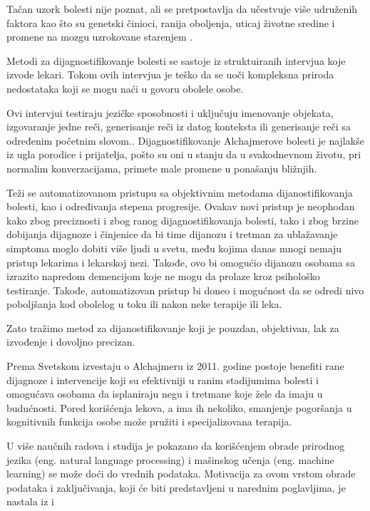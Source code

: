 \documentclass[12pt,oneside]{memoir}
\begin{document}
Tačan uzork bolesti nije poznat,  ali se pretpostavlja da učestvuje više udruženih faktora kao što su genetski činioci, ranija oboljenja, uticaj životne sredine i promene na mozgu uzrokovane starenjem \cite{medicor}.

Metodi za dijagnostifikovanje bolesti se sastoje iz struktuiranih intervjua koje izvode lekari.  Tokom ovih intervjua je teško da se  uoči kompleksna priroda nedostataka koji se mogu naći u govoru obolele osobe.  

Ovi intervjui testiraju jezičke sposobnosti i uključuju imenovanje objekata,  izgovaranje jedne reči,  generisanje reči iz datog konteksta ili generisanje reči sa određenim početnim slovom.\cite{automaticdetandrat}.  Dijagnostifikovanje Alchajmerove bolesti je najlakše iz ugla porodice i prijatelja,  pošto su oni u stanju da u svakodnevnom životu,  pri normalim konverzacijama,  primete male promene u ponašanju bližnjih. 

Teži se automatizovanom pristupu sa objektivnim metodama dijanostifikovanja bolesti,  kao i određivanja stepena progresije.  Ovakav novi pristup je neophodan kako zbog preciznosti i zbog ranog dijagnostifikovanja bolesti,  tako i zbog brzine dobijanja dijagnoze i činjenice da bi time dijanozu i tretman za ublažavanje simptoma moglo dobiti više ljudi u svetu, među kojima danas mnogi nemaju pristup lekarima i lekarskoj nezi.  Takođe,  ovo bi omogućio dijanozu osobama sa izrazito napredom demencijom koje ne mogu da prolaze kroz psihološko testiranje.  Takođe,  automatizovan pristup bi doneo i mogućnost da se odredi nivo poboljšanja kod obolelog u toku ili nakon neke terapije ili leka\cite{Evaloftechfolexicalperformance}.

Zato tražimo metod za dijanostifikovanje koji je pouzdan,  objektivan,  lak za izvođenje i dovoljno precizan.

Prema Svetskom izvestaju o Alchajmeru iz 2011. godine postoje benefiti rane dijagnoze i intervencije koji su efektivniji u ranim stadijumima bolesti i omogućava osobama da isplaniraju negu i tretmane koje žele da imaju u budućnosti. Pored korišćenja lekova, a ima ih nekoliko,  smanjenje pogoršanja u kognitivnih funkcija osobe može pružiti i specijalizovana terapija. 

U više naučnih radova i studija je pokazano da korišćenjem obrade prirodnog jezika (eng. natural language processing) i mašinskog učenja (eng. machine learning) se može doći do vrednih podataka.  Motivacija za ovom vrstom obrade podataka i zaključivanja,  koji će biti predstavljeni u narednim poglavljima,  je nastala iz \cite{automaticdetandrat} i  \cite{linguisticfeatures}
\end{document}
